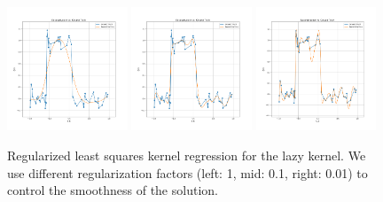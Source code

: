 \begin{figure}
    \centering
    \includegraphics[width=0.32\textwidth]{figures/lazy-square-noise-lsq-1e0.png}
    \includegraphics[width=0.32\textwidth]{figures/lazy-square-noise-lsq-1e-1.png}
    \includegraphics[width=0.32\textwidth]{figures/lazy-square-noise-lsq-1e-2.png}
    \caption{Regularized least squares kernel regression for the lazy kernel. We use different regularization factors (left: 1, mid: 0.1, right: 0.01) to control the smoothness of the solution.}
    \label{fig:lsq-lazy}
\end{figure}


